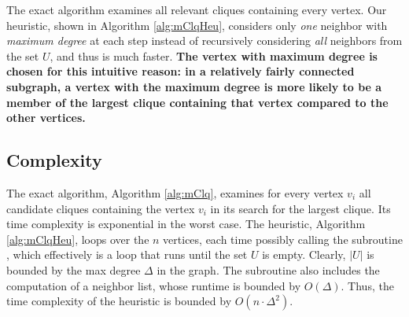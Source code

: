 The exact algorithm examines all relevant cliques containing every vertex.
Our heuristic, shown in Algorithm \ref{alg:mClqHeu}, considers only {\em one} neighbor
with {\em maximum degree} at each step instead of recursively considering {\em all} neighbors 
from the set $U$, and thus is much faster. {\bf The vertex with maximum degree is chosen
for this intuitive reason: in a relatively fairly connected subgraph, a vertex with the maximum degree
is more likely to be a member of the largest clique containing that vertex
compared to the other vertices.}


\subsection{Complexity}
\label{subsec:complexity}

The exact algorithm, Algorithm \ref{alg:mClq}, examines for every vertex $v_i$ all candidate cliques containing the vertex $v_i$ in its search for the largest clique. Its time complexity is exponential in the worst case. The heuristic, Algorithm \ref{alg:mClqHeu}, loops over the $n$ vertices, each time possibly
calling the subroutine \clqh, which effectively is a loop that runs until the set $U$ is empty. 
Clearly, $|U|$ is bounded by the max degree $\Delta$ in the graph.  
The subroutine also includes the computation of a neighbor list, whose runtime is bounded by 
$O(\Delta)$.
Thus, the time complexity of the heuristic is bounded by $O(n\cdot \Delta^{2})$.

